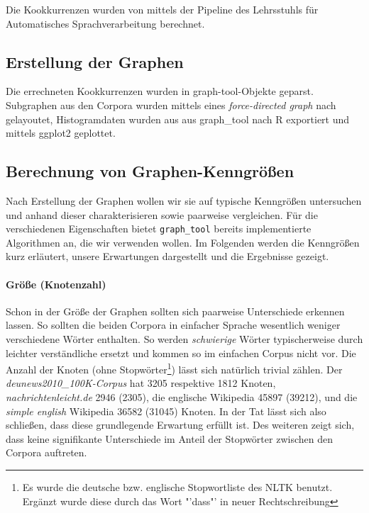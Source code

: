 \documentclass[12pt, a4paper]{article}
\begin{document}
Die Kookkurrenzen wurden von mittels der Pipeline des Lehrsstuhls f\"ur
Automatisches Sprachverarbeitung berechnet.

\subsection{Erstellung der Graphen}

Die errechneten Kookkurrenzen wurden in graph-tool-Objekte geparst. Subgraphen
aus den Corpora wurden mittels eines \emph{force-directed graph} nach
\cite{Hu2005} gelayoutet, Histogramdaten wurden aus aus graph\_tool nach R
exportiert und mittels ggplot2 geplottet.

\subsection{Berechnung von Graphen-Kenngr\"o\ss{}en}

Nach Erstellung der Graphen wollen wir sie auf typische Kenngrößen untersuchen
und anhand dieser charakterisieren sowie paarweise vergleichen. Für die
verschiedenen Eigenschaften bietet \texttt{graph\_tool} bereits implementierte
Algorithmen an, die wir verwenden wollen. Im Folgenden werden die Kenngrößen
kurz erläutert, unsere Erwartungen dargestellt und die Ergebnisse gezeigt.

\paragraph{Gr\"o\ss{}e (Knotenzahl)}

Schon in der Größe der Graphen sollten sich paarweise Unterschiede erkennen
lassen. So sollten die beiden Corpora in einfacher Sprache wesentlich weniger
verschiedene Wörter enthalten. So werden \emph{schwierige} Wörter
typischerweise durch leichter verständliche ersetzt und kommen so im einfachen
Corpus nicht vor. Die Anzahl der Knoten (ohne Stopw\"orter\footnote{Es wurde
die deutsche bzw. englische Stopwortliste des NLTK benutzt. Erg\"anzt wurde
diese durch das Wort "'dass"' in neuer Rechtschreibung}) lässt sich natürlich
trivial zählen. Der \emph{deunews2010\_100K-Corpus} hat 3205 respektive 1812
Knoten, \emph{nachrichtenleicht.de} 2946 (2305), die englische Wikipedia 45897
(39212), und die \emph{simple english} Wikipedia 36582 (31045) Knoten. In der
Tat l\"asst sich also schlie\ss{}en, dass diese grundlegende Erwartung
erf\"ullt ist. Des weiteren zeigt sich, dass keine signifikante Unterschiede im
Anteil der Stopw\"orter zwischen den Corpora auftreten.
\end{document}
